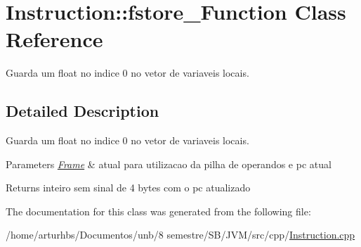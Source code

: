 \hypertarget{classInstruction_1_1fstore__0Function}{}\section{Instruction\+:\+:fstore\+\_\+Function Class Reference}
\label{classInstruction_1_1fstore__0Function}


Guarda um float no indice 0 no vetor de variaveis locais.  




\subsection{Detailed Description}
Guarda um float no indice 0 no vetor de variaveis locais. 


\begin{DoxyParams}{Parameters}
{\em \hyperlink{classFrame}{Frame}} & atual para utilizacao da pilha de operandos e pc atual \\
\hline
\end{DoxyParams}
\begin{DoxyReturn}{Returns}
inteiro sem sinal de 4 bytes com o pc atualizado 
\end{DoxyReturn}


The documentation for this class was generated from the following file\+:\begin{DoxyCompactItemize}
\item 
/home/arturhbs/\+Documentos/unb/8 semestre/\+S\+B/\+J\+V\+M/src/cpp/\hyperlink{Instruction_8cpp}{Instruction.\+cpp}\end{DoxyCompactItemize}
